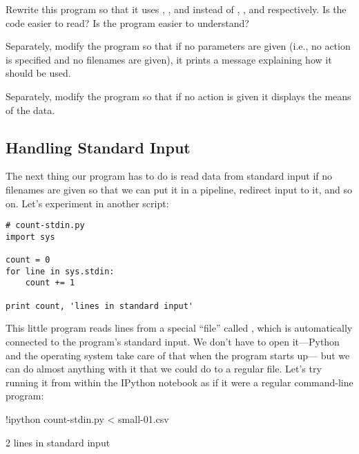 \begin{challenge}
  Rewrite this program so that it uses , , and
   instead of , , and
   respectively. Is the code easier to read? Is the
  program easier to understand?
\end{challenge}

\begin{challenge}
  Separately, modify the program so that if no parameters are given
  (i.e., no action is specified and no filenames are given), it prints a
  message explaining how it should be used.
\end{challenge}

\begin{challenge}
  Separately, modify the program so that if no action is given it
  displays the means of the data.
\end{challenge}

\subsection{Handling Standard Input}

The next thing our program has to do is read data from standard input if
no filenames are given so that we can put it in a pipeline, redirect
input to it, and so on. Let's experiment in another script:

\begin{Verbatim}
# count-stdin.py
import sys

count = 0
for line in sys.stdin:
    count += 1

print count, 'lines in standard input'
\end{Verbatim}

This little program reads lines from a special ``file'' called
, which is automatically connected to the program's
standard input. We don't have to open it---Python and the operating
system take care of that when the program starts up--- but we can do
almost anything with it that we could do to a regular file. Let's try
running it from within the IPython notebook as if it were a regular command-line program:

\begin{VerbIn}
!ipython count-stdin.py < small-01.csv
\end{VerbIn}

\begin{VerbOut}
2 lines in standard input
\end{VerbOut}

